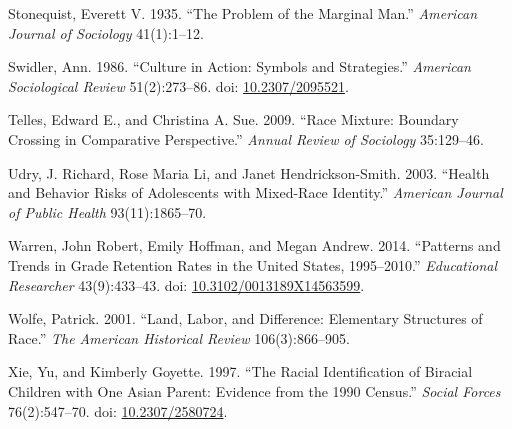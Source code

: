 \documentclass[
  letterpaper,
  DIV=11,
  numbers=noendperiod]{scrartcl}
\newlength{\cslhangindent}
\newlength{\cslentryspacingunit} %
\newenvironment{CSLReferences}[2] %
 {%
  \setlength{\parindent}{0pt}
  \ifodd #1
  \let\oldpar\par
  \def\par{\hangindent=\cslhangindent\oldpar}
  \fi
  \setlength{\parskip}{#2\cslentryspacingunit}
 }%
 {}
\begin{document}
\begin{CSLReferences}{1}{0}
\leavevmode{}%
Stonequist, Everett V. 1935. {``The {Problem} of the {Marginal Man}.''}
\emph{American Journal of Sociology} 41(1):1--12.

\leavevmode{}%
Swidler, Ann. 1986. {``Culture in {Action}: {Symbols} and
{Strategies}.''} \emph{American Sociological Review} 51(2):273--86. doi:
\href{https://doi.org/10.2307/2095521}{10.2307/2095521}.

\leavevmode{}%
Telles, Edward E., and Christina A. Sue. 2009. {``Race {Mixture}:
{Boundary Crossing} in {Comparative Perspective}.''} \emph{Annual Review
of Sociology} 35:129--46.

\leavevmode{}%
Udry, J. Richard, Rose Maria Li, and Janet Hendrickson-Smith. 2003.
{``Health and {Behavior Risks} of {Adolescents} with {Mixed-Race
Identity}.''} \emph{American Journal of Public Health} 93(11):1865--70.

\leavevmode{}%
Warren, John Robert, Emily Hoffman, and Megan Andrew. 2014. {``Patterns
and {Trends} in {Grade Retention Rates} in the {United States},
1995--2010.''} \emph{Educational Researcher} 43(9):433--43. doi:
\href{https://doi.org/10.3102/0013189X14563599}{10.3102/0013189X14563599}.

\leavevmode{}%
Wolfe, Patrick. 2001. {``Land, {Labor}, and {Difference}: {Elementary
Structures} of {Race}.''} \emph{The American Historical Review}
106(3):866--905.

\leavevmode{}%
Xie, Yu, and Kimberly Goyette. 1997. {``The {Racial Identification} of
{Biracial Children} with {One Asian Parent}: {Evidence} from the 1990
{Census}.''} \emph{Social Forces} 76(2):547--70. doi:
\href{https://doi.org/10.2307/2580724}{10.2307/2580724}.

\end{CSLReferences}
\end{document}
